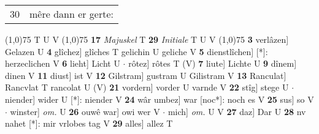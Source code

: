 \documentclass[8pt,a4paper,notitlepage]{article}
\begin{document}
\begin{table}[ht]
\begin{minipage}[t]{0.5\linewidth}
\begin{tabular}{rl}
30 & mêre dann er gerte:\\ 
\end{tabular}
\scriptsize
\line(1,0){75} \newline
T U V \newline
\line(1,0){75} \newline
\textbf{17} \textit{Majuskel} T  \textbf{29} \textit{Initiale} T U V  \newline
\line(1,0){75} \newline
\textbf{3} verlâzen] Gelazen U \textbf{4} glîchez] glîches T gelichin U geliche V \textbf{5} dienstlîchen] [*]: herzeclichen V \textbf{6} lieht] Licht U  $\cdot$ rôtez] rôtes T (V) \textbf{7} liute] Lichte U \textbf{9} dînem] dinen V \textbf{11} diust] ist V \textbf{12} Gilstram] gustram U Gilistram V \textbf{13} Ranculat] Rancvlat T rancolat U (V) \textbf{21} vordern] vorder U varnde V \textbf{22} stîg] stege U  $\cdot$ niender] wider U [*]: niender V \textbf{24} wâr umbez] war [noc*]: noch es V \textbf{25} sus] so V  $\cdot$ winster] \textit{om.} U \textbf{26} ouwê war] owi wer V  $\cdot$ mich] \textit{om.} U V \textbf{27} daz] Dar U \textbf{28} nv nahet [*]: mir vrlobes tag V \textbf{29} alles] allez T \newline
\end{minipage}
\end{table}
\end{document}
